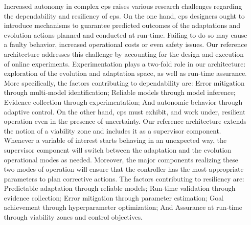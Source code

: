 Increased autonomy in complex \gls{cps} raises various research challenges regarding the dependability and resiliency of \gls{cps}. On the one hand, \gls{cps} designers ought to introduce mechanisms to guarantee predicted outcomes of the adaptations and evolution actions planned and conducted at run-time. Failing to do so may cause a faulty behavior, increased operational costs or even safety issues. Our reference architecture addresses this challenge by accounting for the design and execution of online experiments. Experimentation plays a two-fold role in our architecture: exploration of the evolution and adaptation space, as well as run-time assurance. More specifically, the factors contributing to dependability are: Error mitigation through multi-model identification; Reliable models through model inference; Evidence collection through experimentation; And autonomic behavior through adaptive control. On the other hand, \gls{cps} must exhibit, and work under, resilient operation even in the presence of uncertainty. Our reference architecture extends the notion of a viability zone and includes it as a supervisor component. Whenever a variable of interest starts behaving in an unexpected way, the supervisor component will switch between the adaptation and the evolution operational modes as needed. Moreover, the major components realizing these two modes of operation will ensure that the controller has the most appropriate parameters to plan corrective actions. The factors contributing to resiliency are: Predictable adaptation through reliable models; Run-time validation through evidence collection; Error mitigation through parameter estimation; Goal achievement through hyperparameter optimization; And Assurance at run-time through viability zones and control objectives.

